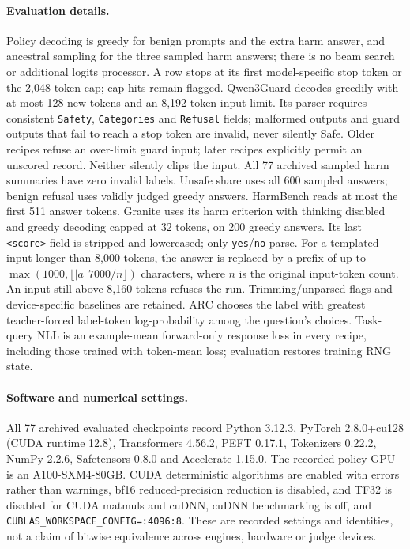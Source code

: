 \documentclass{article}
\begin{document}
\paragraph{Evaluation details.} Policy decoding is greedy for benign prompts
and the extra harm answer, and ancestral sampling for the three sampled
harm answers; there is no beam search or additional logits processor.
A row stops at its first model-specific stop token or the 2,048-token cap;
cap hits remain flagged. Qwen3Guard decodes greedily with at most 128 new
tokens and an 8,192-token input limit. Its parser requires consistent
\texttt{Safety}, \texttt{Categories} and \texttt{Refusal} fields; malformed
outputs and guard outputs that fail to reach a stop token are invalid, never
silently Safe. Older recipes refuse an over-limit guard input; later recipes explicitly
permit an unscored record. Neither silently clips the input. All 77 archived sampled
harm summaries have zero invalid labels. Unsafe share uses all 600 sampled
answers; benign refusal uses validly judged greedy answers. HarmBench reads
at most the first 511 answer tokens. Granite uses its harm criterion with
thinking disabled and greedy decoding capped at 32 tokens, on 200 greedy
answers. Its last \texttt{<score>} field is stripped and lowercased; only
\texttt{yes}/\texttt{no} parse. For a templated input longer than 8,000
tokens, the answer is replaced by a prefix of up to
$\max(1000,\lfloor |a|\,7000/n\rfloor)$ characters, where $n$ is the original
input-token count. An input still above 8,160 tokens refuses the run.
Trimming/unparsed flags and device-specific baselines are retained. ARC chooses the label with greatest teacher-forced
label-token log-probability among the question's choices. Task-query NLL is
an example-mean forward-only response loss in every recipe, including
those trained with token-mean loss; evaluation restores training RNG state.

\paragraph{Software and numerical settings.} All 77 archived evaluated
checkpoints record Python 3.12.3, PyTorch 2.8.0+cu128 (CUDA runtime 12.8),
Transformers 4.56.2, PEFT 0.17.1, Tokenizers 0.22.2, NumPy 2.2.6,
Safetensors 0.8.0 and Accelerate 1.15.0. The recorded policy GPU is an
A100-SXM4-80GB. CUDA deterministic algorithms are enabled with errors rather
than warnings, bf16 reduced-precision reduction is disabled, and TF32 is disabled for CUDA matmuls and cuDNN, cuDNN benchmarking
is off, and \texttt{CUBLAS\_WORKSPACE\_CONFIG=:4096:8}. These are recorded
settings and identities, not a claim of bitwise equivalence across engines,
hardware or judge devices.
\end{document}
